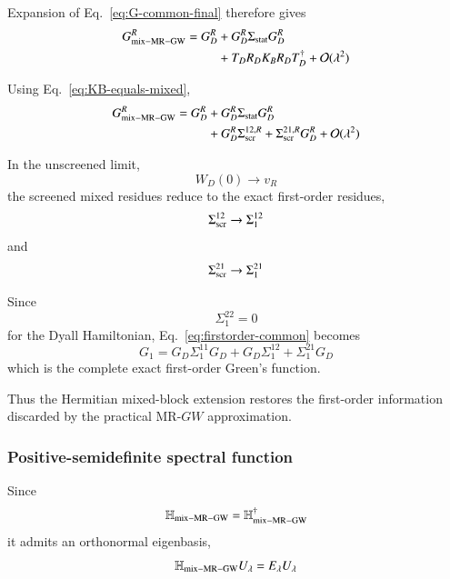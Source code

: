 \documentclass[aip,jcp,reprint,noshowkeys,superscriptaddress]{revtex4-1}
\begin{document}
Expansion of Eq.~\eqref{eq:G-common-final} therefore gives
\begin{equation}
  \begin{aligned}
  G_{\rm mix-MR-GW}^{R}
  =
  G_D^R
  &+
  G_D^R
  \Sigma_{\rm stat}
  G_D^R
  \\
  &+
  T_DR_DK_BR_DT_D^\dagger
  +
  \mathcal O(\lambda^2)
  \end{aligned}
\end{equation}

Using Eq.~\eqref{eq:KB-equals-mixed},
\begin{equation}
  \begin{aligned}
  G_{\rm mix-MR-GW}^{R}
  =
  G_D^R
  &+
  G_D^R
  \Sigma_{\rm stat}
  G_D^R
  \\
  &+
  G_D^R
  \Sigma_{\rm scr}^{12,R}
  +
  \Sigma_{\rm scr}^{21,R}
  G_D^R
  +
  \mathcal O(\lambda^2)
  \end{aligned}
  \label{eq:firstorder-common}
\end{equation}

In the unscreened limit,
\begin{equation}
  W_D(0)\rightarrow v_R
\end{equation}
the screened mixed residues reduce to the exact first-order residues,
\begin{equation}
  \Sigma_{\rm scr}^{12}
  \rightarrow
  \Sigma_1^{12}
\end{equation}
and
\begin{equation}
  \Sigma_{\rm scr}^{21}
  \rightarrow
  \Sigma_1^{21}
\end{equation}

Since
\begin{equation}
  \Sigma_1^{22}=0
\end{equation}
for the Dyall Hamiltonian, Eq.~\eqref{eq:firstorder-common} becomes
\begin{equation}
  G_1
  =
  G_D\Sigma_1^{11}G_D
  +
  G_D\Sigma_1^{12}
  +
  \Sigma_1^{21}G_D
\end{equation}
which is the complete exact first-order Green's function.

Thus the Hermitian mixed-block extension restores the first-order
information discarded by the practical MR-$GW$ approximation.


\subsubsection{Positive-semidefinite spectral function}

Since
\begin{equation}
  \mathbb H_{\rm mix-MR-GW}
  =
  \mathbb H_{\rm mix-MR-GW}^\dagger
\end{equation}
it admits an orthonormal eigenbasis,
\begin{equation}
  \mathbb H_{\rm mix-MR-GW}
  U_\lambda
  =
  E_\lambda U_\lambda
\end{equation}
\end{document}
